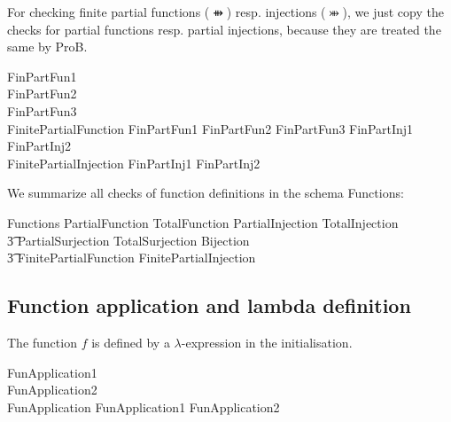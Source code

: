 \documentclass{article}
\begin{document}
For checking finite partial functions ($\ffun$) resp. injections ($\finj$), we just
copy the checks for partial functions resp. partial injections, because
they are treated the same by ProB.
\begin{zed}
  FinPartFun1 \\
  FinPartFun2 \\
  FinPartFun3 \\
  FinitePartialFunction  FinPartFun1 \land FinPartFun2 \land FinPartFun3
  \also
  FinPartInj1 \\
  FinPartInj2 \\
  FinitePartialInjection  FinPartInj1 \land FinPartInj2    
\end{zed}
We summarize all checks of function definitions in the schema Functions:
\begin{zed}
  Functions  PartialFunction \land TotalFunction \land PartialInjection \land TotalInjection \land {} \\
  \t3 PartialSurjection \land TotalSurjection \land Bijection \land {} \\
  \t3 FinitePartialFunction \land FinitePartialInjection\\
\end{zed}

\subsection{Function application and lambda definition}
The function $f$ is defined by a $\lambda$-expression in the initialisation.
\begin{zed}
  FunApplication1 \\
  FunApplication2 \\
  FunApplication  FunApplication1 \land FunApplication2
\end{zed}
\end{document}
